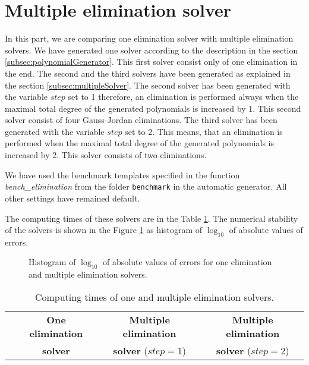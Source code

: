 \section{Multiple elimination solver}
\label{exp:elim}
In this part, we are comparing one elimination solver with multiple elimination solvers. We have generated one solver according to the description in the section \ref{subsec:polynomialGenerator}. This first solver consist only of one elimination in the end. The second and the third solvers have been generated as explained in the section \ref{subsec:multipleSolver}. The second solver has been generated with the variable $step$ set to 1 therefore, an elimination is performed always when the maximal total degree of the generated polynomials is increased by 1. This second solver consist of four Gauss-Jordan eliminations. The third solver has been generated with the variable $step$ set to 2. This means, that an elimination is performed when the maximal total degree of the generated polynomials is increased by 2. This solver consists of two eliminations.

We have used the benchmark templates specified in the function \textit{bench\_elimination} from the folder \texttt{benchmark} in the automatic generator. All other settings have remained default.

The computing times of these solvers are in the Table \ref{tab:elim}. The numerical stability of the solvers is shown in the Figure \ref{graph:elim} as histogram of $\log_{10}$ of absolute values of errors.

\begin{figure}[ht]
  \centering
  \resizebox{0.95\textwidth}{!}{}
  \caption{Histogram of $\log_{10}$ of absolute values of errors for one elimination and multiple elimination solvers.}
  \label{graph:elim}
\end{figure}

\begin{table}[ht]
  \centering
  \begin{tabular}{|c||ccc|}
    \hline
      & \textbf{One elimination} & \textbf{Multiple elimination} & \textbf{Multiple elimination} \\
      & \textbf{solver}          & \textbf{solver} ($step = 1$)  & \textbf{solver} ($step = 2$)\\
    \hline\hline
    
    \hline
  \end{tabular}
  \caption{Computing times of one and multiple elimination solvers.}
  \label{tab:elim}
\end{table}

